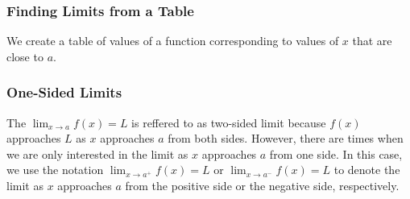 \documentclass{report}
\begin{document}
\subsubsection{Finding Limits from a Table}
We create a table of values of a function corresponding to values of $x$ that are close to $a$.

\subsubsection{One-Sided Limits}
The $\lim_{x \to a}  f(x)=L$ is reffered to as two-sided limit because $f(x)$ approaches $L$ as $x$ approaches $a$ from both sides. However, there are times when we are only interested in the limit as $x$ approaches $a$ from one side. In this case, we use the notation $\lim_{x \to a^+}  f(x)=L$ or $\lim_{x \to a^-}  f(x)=L$ to denote the limit as $x$ approaches $a$ from the positive side or the negative side, respectively.
\end{document}
